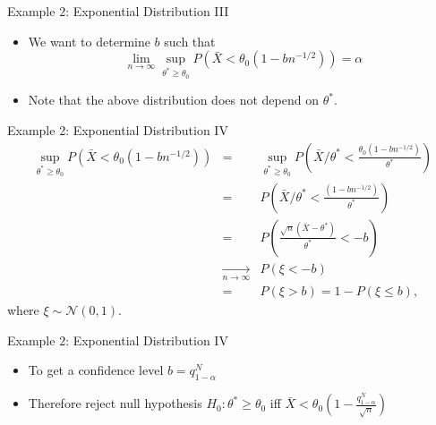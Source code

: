 \documentclass{beamer}
\begin{document}
\begin{frame}{Example 2: Exponential Distribution III} 
\begin{itemize} 
 \item We want to determine $b$ such that 
\begin{displaymath} 
 \lim_{n \rightarrow \infty} \sup_{\theta^* \geq \theta_0}P(\bar{X} < \theta_0(1 - bn^{-1/2})) = \alpha 
\end{displaymath}
\item Note that the above distribution does not depend on $\theta^*$. 
\end{itemize}
\end{frame}

\begin{frame}{Example 2: Exponential Distribution IV} 
\begin{eqnarray*} 
 \sup_{\theta^* \geq \theta_0} P(\bar{X} < \theta_0(1 - bn^{-1/2}))  &=& \sup_{\theta^* \geq \theta_0} P\left(\bar{X}/\theta^* < \frac{\theta_0(1 - bn^{-1/2})}{\theta^*}\right)  \\ 
&=& P\left(\bar{X}/\theta^* < \frac{(1 - bn^{-1/2})}{\theta^*}\right)  \\ 
&=& P\left(\frac{\sqrt{n}(\bar{X} - \theta^*)}{\theta^*} < - b\right)  \\ 
&\xrightarrow[n \rightarrow \infty]{} & P(\xi < -b) \\ 
&=& P(\xi > b) = 1 - P(\xi \leq b),
\end{eqnarray*}
where $\xi \sim \mathcal{N}(0, 1)$. 
\end{frame}

\begin{frame}{Example 2: Exponential Distribution IV} 
\begin{itemize} 
 \item To get a confidence level $b = q^N_{1-\alpha}$ 
\item Therefore reject null hypothesis $H_0: \theta^* \geq \theta_0$ iff $\bar{X} < \theta_0(1 - \frac{q_{1-\alpha}^N}{\sqrt{n}}) $
\end{itemize}

\end{frame}
\end{document}
